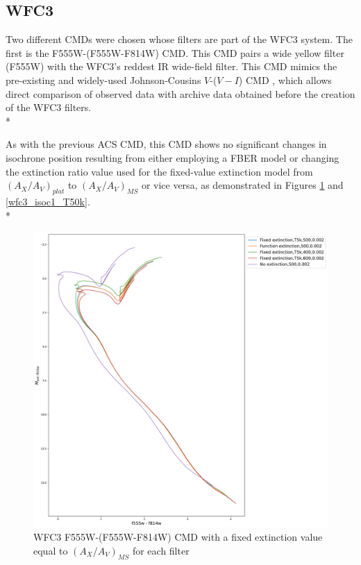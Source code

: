 \documentclass[12pt, a4paper]{report}
\begin{document}
\subsection{WFC3} \label{WFC3_isoc}

Two different CMDs were chosen whose filters are part of the WFC3 system. The first is the F555W-(F555W-F814W) CMD. This CMD pairs a wide yellow filter (F555W) with the WFC3's reddest IR wide-field filter. This CMD mimics the pre-existing and widely-used Johnson-Cousins $V$-($V-I$) CMD \citep{2014wfc..rept...16S}, which allows direct comparison of observed data with archive data obtained before the creation of the WFC3 filters.\\*

As with the previous ACS CMD, this CMD shows no significant changes in isochrone position resulting from either employing a FBER model or changing the extinction ratio value used for the fixed-value extinction model from $(A_{X}/A_{V})_{plat}$ to $(A_{X}/A_{V})_{MS}$ or vice versa, as demonstrated in Figures \ref{wfc3_isoc1_T5k} and \ref{wfc3_isoc1_T50k}.\\*

\begin{figure}[h]
\begin{center}
\includegraphics[width=1.0\textwidth]{../basti_isochrones_10_13Gyr/Extinction_T5k_FeH0fix_func_f555w_f555wmf814w_500_400_600_Myr_FeH_0p002_ref_noext_Av_1p0.pdf}
\caption{WFC3 F555W-(F555W-F814W) CMD with a fixed extinction value equal to $(A_{X}/A_{V})_{MS}$ for each filter}
\label{wfc3_isoc1_T5k}
\end{center}
\end{figure}
\end{document}
